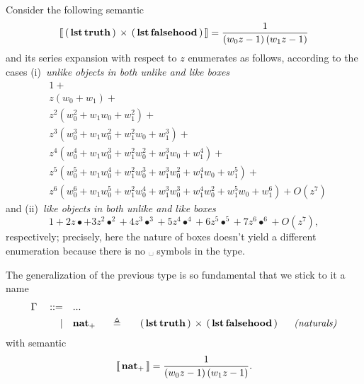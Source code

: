 \begin{example}
Consider the following semantic
\begin{displaymath}
    \left\llbracket\,\left(\,\textbf{lst}\,\textbf{truth}\,\right)\,\times\,\left(\,\textbf{lst}\,\textbf{falsehood}\,\right)\,\right\rrbracket = \frac{1}{\left(w_{0} z - 1\right) \left(w_{1} z - 1\right)}
\end{displaymath}
and its series expansion with respect to $z$ enumerates as follows,
according to the cases (i)~\textit{unlike objects in both unlike and like boxes}
\begin{displaymath}
\begin{split}
&1 + \\
&z \left(w_{0} + w_{1}\right) + \\
&z^{2} \left(w_{0}^{2} + w_{1} w_{0} + w_{1}^{2}\right) + \\
&z^{3} \left(w_{0}^{3} + w_{1} w_{0}^{2} + w_{1}^{2} w_{0} + w_{1}^{3}\right) + \\
&z^{4} \left(w_{0}^{4} + w_{1} w_{0}^{3} + w_{1}^{2} w_{0}^{2} + w_{1}^{3} w_{0} + w_{1}^{4}\right) + \\
&z^{5} \left(w_{0}^{5} + w_{1} w_{0}^{4} + w_{1}^{2} w_{0}^{3} + w_{1}^{3} w_{0}^{2} + w_{1}^{4} w_{0} + w_{1}^{5}\right) + \\
&z^{6} \left(w_{0}^{6} + w_{1} w_{0}^{5} + w_{1}^{2} w_{0}^{4} + w_{1}^{3} w_{0}^{3} + w_{1}^{4} w_{0}^{2} + w_{1}^{5} w_{0} + w_{1}^{6}\right) + O\left(z^{7}\right)
\end{split}
\end{displaymath}
and (ii)~\textit{like objects in both unlike and like boxes}
\begin{displaymath}
1 + 2 z \bullet + 3 z^{2} \bullet^{2} + 4 z^{3} \bullet^{3} + 5 z^{4} \bullet^{4} + 6 z^{5} \bullet^{5} + 7 z^{6} \bullet^{6} + O\left(z^{7}\right),
\end{displaymath}
respectively; precisely, here the nature of boxes doesn't yield a different
enumeration because there is no $␣$ symbols in the type.
\end{example}

\begin{definition}
The generalization of the previous type is so fundamental that we stick to it a name
\begin{displaymath}
\begin{split}
    \Gamma\quad::=\quad&... \\
           |\quad&\tydef{\typosnat}{\tycp{\typarens{\tylst{\tytruth}}}{\typarens{\tylst{\tyfalsehood}}}}{naturals}
\end{split}
\end{displaymath}
with semantic
\begin{displaymath}
    \left\llbracket\,\textbf{nat}_{+}\,\right\rrbracket =  \frac{1}{\left(w_{0} z - 1\right) \left(w_{1} z - 1\right)}.
\end{displaymath}
\end{definition}

